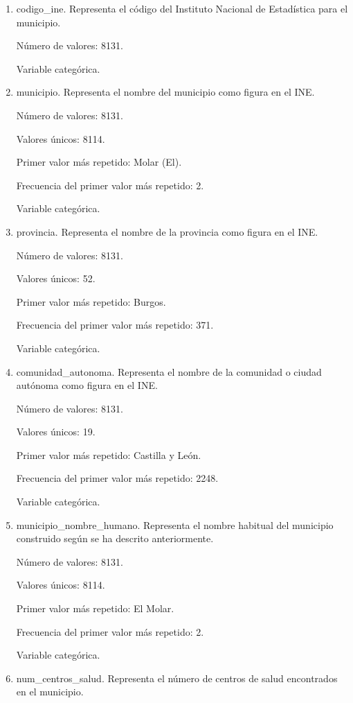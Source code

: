 \begin{enumerate}
    	\item codigo\_ine. Representa el código del Instituto Nacional de Estadística para el municipio.
	
	Número de valores: 8131.
	
	Variable categórica.

	\item municipio. Representa el nombre del municipio como figura en el INE.
	
	Número de valores: 8131.
	
	Valores únicos: 8114.
	
	Primer valor más repetido: Molar (El).
	
	Frecuencia del primer valor más repetido: 2.
	
	Variable categórica.

	\item provincia. Representa el nombre de la provincia como figura en el INE.
	
	Número de valores: 8131.
	
	Valores únicos: 52.
	
	Primer valor más repetido: Burgos.
	
	Frecuencia del primer valor más repetido: 371.
	
	Variable categórica.

	\item comunidad\_autonoma. Representa el nombre de la comunidad o ciudad autónoma como figura en el INE.
	
	Número de valores: 8131.
	
	Valores únicos: 19.
	
	Primer valor más repetido: Castilla y León.
	
	Frecuencia del primer valor más repetido: 2248.
	
	Variable categórica.

	\item municipio\_nombre\_humano. Representa el nombre habitual del municipio construido según se ha descrito anteriormente.
	
	Número de valores: 8131.
	
	Valores únicos: 8114.
	
	Primer valor más repetido: El Molar.
	
	Frecuencia del primer valor más repetido: 2.
	
	Variable categórica.

	\item num\_centros\_salud. Representa el número de centros de salud encontrados en el municipio.
	

\end{enumerate}
